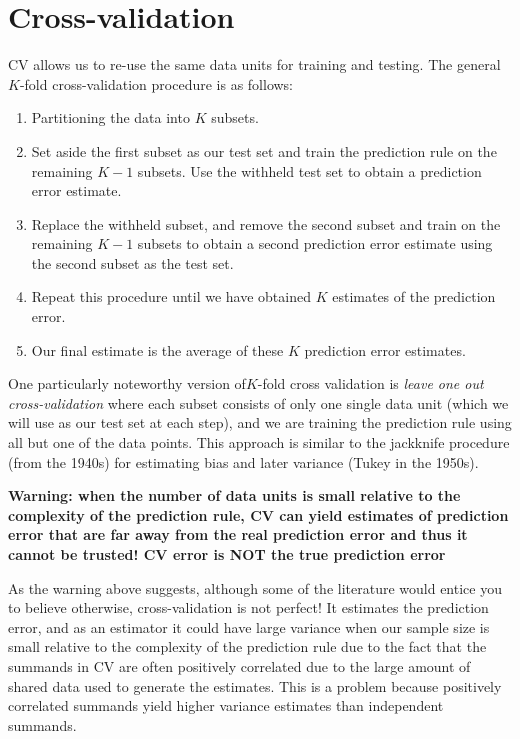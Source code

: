 \section{Cross-validation}

CV allows us to re-use the same data units for training and testing. The general $K$-fold cross-validation procedure is as follows:

\begin{enumerate}
\item Partitioning the data into $K$ subsets.
\item Set aside the first subset as our test set and train the prediction rule on the remaining $K-1$ subsets. Use the withheld test set to obtain a prediction error estimate. 
\item Replace the withheld subset, and remove the second subset and train on the remaining $K-1$ subsets to obtain a second prediction error estimate using the second subset as the test set. 
\item Repeat this procedure until we have obtained $K$ estimates of the prediction error.
\item Our final estimate is the average of these $K$ prediction error estimates.
\end{enumerate}


One particularly noteworthy version of$K$-fold cross validation is \textit{leave one out cross-validation} where each subset consists of only one single data unit (which we will use as our test set at each step), and we are training the prediction rule using all but one of the data points. This approach is similar to the jackknife procedure (from the 1940s) for estimating bias and later variance (Tukey in the 1950s).


\textbf{Warning: when the number of data units is small relative to the complexity of the prediction rule, CV can yield estimates of prediction error that are far away from the real prediction error and thus it cannot be trusted! CV error is NOT the true prediction error}

As the warning above suggests, although some of the literature would entice you to believe otherwise, cross-validation is not perfect! It estimates the prediction error, and as an estimator it could have large variance when our sample size is small relative to the complexity of the prediction rule due to the fact that the summands in CV are often positively correlated due to the large amount of shared data used to generate the estimates. This is a problem because positively correlated summands yield higher variance estimates than independent summands.


